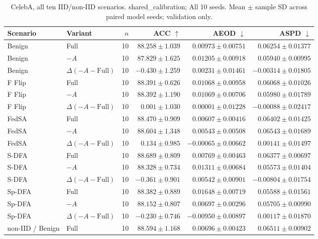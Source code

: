 \begin{table}[t]
\centering
\small
\caption{CelebA, all ten IID/non-IID scenarios. shared\_calibration; All 10 seeds. Mean $\pm$ sample SD across paired model seeds; validation only.}
\begin{tabular}{llrrrr}
\toprule
Scenario & Variant & $n$ & ACC $\uparrow$ & AEOD $\downarrow$ & ASPD $\downarrow$ \\
\midrule
Benign & Full & 10 & $88.258 \pm 1.039$ & $0.00973 \pm 0.00751$ & $0.06254 \pm 0.01377$ \\
Benign & $-A$ & 10 & $87.829 \pm 1.625$ & $0.01205 \pm 0.00918$ & $0.05940 \pm 0.00995$ \\
Benign & $\Delta(-A-\mathrm{Full})$ & 10 & $-0.430 \pm 1.259$ & $0.00231 \pm 0.01461$ & $-0.00314 \pm 0.01805$ \\
F Flip & Full & 10 & $88.391 \pm 0.626$ & $0.01068 \pm 0.00958$ & $0.06068 \pm 0.01026$ \\
F Flip & $-A$ & 10 & $88.392 \pm 1.190$ & $0.01069 \pm 0.00706$ & $0.05980 \pm 0.01789$ \\
F Flip & $\Delta(-A-\mathrm{Full})$ & 10 & $0.001 \pm 1.030$ & $0.00001 \pm 0.01228$ & $-0.00088 \pm 0.02417$ \\
FedSA & Full & 10 & $88.470 \pm 0.909$ & $0.00607 \pm 0.00416$ & $0.06402 \pm 0.01425$ \\
FedSA & $-A$ & 10 & $88.604 \pm 1.348$ & $0.00543 \pm 0.00508$ & $0.06543 \pm 0.01689$ \\
FedSA & $\Delta(-A-\mathrm{Full})$ & 10 & $0.134 \pm 0.985$ & $-0.00065 \pm 0.00662$ & $0.00141 \pm 0.01497$ \\
S-DFA & Full & 10 & $88.689 \pm 0.809$ & $0.00769 \pm 0.00463$ & $0.06377 \pm 0.00697$ \\
S-DFA & $-A$ & 10 & $88.328 \pm 0.734$ & $0.01311 \pm 0.00684$ & $0.05573 \pm 0.01404$ \\
S-DFA & $\Delta(-A-\mathrm{Full})$ & 10 & $-0.361 \pm 0.901$ & $0.00542 \pm 0.00901$ & $-0.00804 \pm 0.01754$ \\
Sp-DFA & Full & 10 & $88.382 \pm 0.889$ & $0.01648 \pm 0.00719$ & $0.05588 \pm 0.01561$ \\
Sp-DFA & $-A$ & 10 & $88.152 \pm 0.807$ & $0.00697 \pm 0.00296$ & $0.05705 \pm 0.00990$ \\
Sp-DFA & $\Delta(-A-\mathrm{Full})$ & 10 & $-0.230 \pm 0.746$ & $-0.00950 \pm 0.00897$ & $0.00117 \pm 0.01870$ \\
non-IID / Benign & Full & 10 & $88.594 \pm 1.168$ & $0.00696 \pm 0.00423$ & $0.06511 \pm 0.00902$ \\

\end{tabular}
\end{table}
